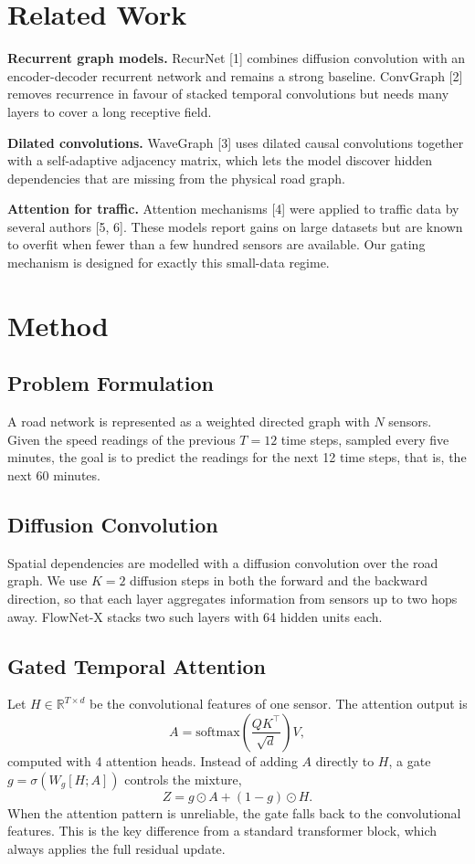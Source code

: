 \documentclass[10pt,twocolumn]{article}
\begin{document}
\section{Related Work}
\textbf{Recurrent graph models.} RecurNet [1] combines diffusion convolution with an encoder-decoder recurrent network and remains a strong baseline. ConvGraph [2] removes recurrence in favour of stacked temporal convolutions but needs many layers to cover a long receptive field.

\textbf{Dilated convolutions.} WaveGraph [3] uses dilated causal convolutions together with a self-adaptive adjacency matrix, which lets the model discover hidden dependencies that are missing from the physical road graph.

\textbf{Attention for traffic.} Attention mechanisms [4] were applied to traffic data by several authors [5, 6]. These models report gains on large datasets but are known to overfit when fewer than a few hundred sensors are available. Our gating mechanism is designed for exactly this small-data regime.

\section{Method}
\subsection{Problem Formulation}
A road network is represented as a weighted directed graph with $N$ sensors. Given the speed readings of the previous $T = 12$ time steps, sampled every five minutes, the goal is to predict the readings for the next 12 time steps, that is, the next 60 minutes.

\subsection{Diffusion Convolution}
Spatial dependencies are modelled with a diffusion convolution over the road graph. We use $K = 2$ diffusion steps in both the forward and the backward direction, so that each layer aggregates information from sensors up to two hops away. FlowNet-X stacks two such layers with 64 hidden units each.

\subsection{Gated Temporal Attention}
Let $H \in \mathbb{R}^{T \times d}$ be the convolutional features of one sensor. The attention output is
\begin{equation}
A = \mathrm{softmax}\left(\frac{QK^{\top}}{\sqrt{d}}\right)V ,
\end{equation}
computed with 4 attention heads. Instead of adding $A$ directly to $H$, a gate $g = \sigma(W_g [H ; A])$ controls the mixture,
\begin{equation}
Z = g \odot A + (1 - g) \odot H .
\end{equation}
When the attention pattern is unreliable, the gate falls back to the convolutional features. This is the key difference from a standard transformer block, which always applies the full residual update.
\end{document}
